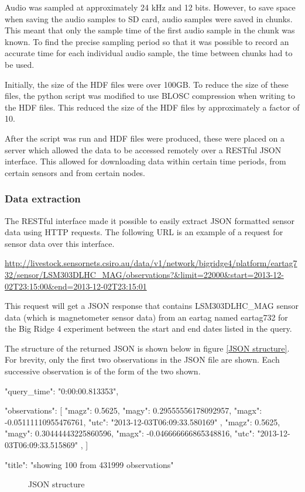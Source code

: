 Audio was sampled at approximately 24 kHz and 12 bits. However, to save space when saving the audio samples to SD card, audio samples were saved in chunks. This meant that only the sample time of the first audio sample in the chunk was known. To find the precise sampling period so that it was possible to record an accurate time for each individual audio sample, the time between chunks had to be used.  

Initially, the size of the HDF files were over 100GB. To reduce the size of these files, the python script was modified to use BLOSC compression when writing to the HDF files. This reduced the size of the HDF files by approximately a factor of 10.

After the script was run and HDF files were produced, these were placed on a server which allowed the data to be accessed remotely over a RESTful JSON interface. This allowed for downloading data within certain time periods, from certain sensors and from certain nodes. 

\subsubsection{Data extraction}
\label{extraction}
The RESTful interface made it possible to easily extract JSON formatted sensor data using HTTP requests. The following URL is an example of a request for sensor data over this interface. 

\url{http://livestock.sensornets.csiro.au/data/v1/network/bigridge4/platform/eartag732/sensor/LSM303DLHC\_MAG/observations?\&limit=22000\&start=2013-12-02T23:15:00\&end=2013-12-02T23:15:01} 

This request will get a JSON response that contains LSM303DLHC\_MAG sensor data (which is magnetometer sensor data) from an eartag named eartag732 for the Big Ridge 4 experiment between the start and end dates listed in the query. 

The structure of the returned JSON is shown below in figure \ref{JSON structure}. For brevity, only the first two observations in the JSON file are shown. Each successive observation is of the form of the two shown. 

\begin{verbbox}
{
    "query_time": "0:00:00.813353",

    "observations": [
            {
                "magz": 0.5625,
                "magy": 0.29555556178092957,
                "magx": -0.05111110955476761,
                "utc": "2013-12-03T06:09:33.580169"
            },
            {
                "magz": 0.5625,
                "magy": 0.30444443225860596,
                "magx": -0.046666666865348816,
                "utc": "2013-12-03T06:09:33.515869"
            },
        ]

    "title": "showing 100 from 431999 observations"
}
\end{verbbox}
\begin{figure}[ht!]
  \centering
  \theverbbox
  \caption{JSON structure}
\end{figure}

